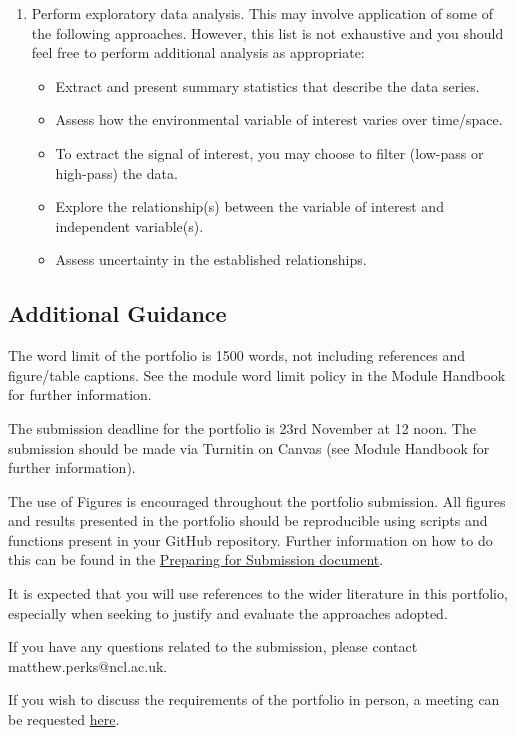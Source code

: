 \documentclass[11pt,onecolumn,a4paper,notitlepage]{article}
\begin{document}
\begin{enumerate}[resume]
\item{Perform exploratory data analysis. This may involve application of some of the following approaches. However, this list is not exhaustive and you should feel free to perform additional analysis as appropriate:} 

\begin{itemize}
\item{Extract and present summary statistics that describe the data series.}
\item{Assess how the environmental variable of interest varies over time/space.}
\item{To extract the signal of interest, you may choose to filter (low-pass or high-pass) the data.}
\item{Explore the relationship(s) between the variable of interest and independent variable(s).}
\item{Assess uncertainty in the established relationships.}
\end{itemize}

\end{enumerate}


\subsection*{Additional Guidance}

\noindent The word limit of the portfolio is 1500 words, not including references and figure/table captions. See the module word limit policy in the Module Handbook for further information.
\bigskip

\noindent 
The submission deadline for the portfolio is 23rd November at 12 noon. The submission should be made via Turnitin on Canvas (see Module Handbook for further information).
\bigskip

\noindent 
The use of Figures is encouraged throughout the portfolio submission. All figures and results presented in the portfolio should be reproducible using scripts and functions present in your GitHub repository. Further information on how to do this can be found in the \href{}{Preparing for Submission document}.
\bigskip

\noindent 
It is expected that you will use references to the wider literature in this portfolio, especially when seeking to justify and evaluate the approaches adopted.
\bigskip

\noindent If you have any questions related to the submission, please contact matthew.perks@ncl.ac.uk.

\bigskip

\noindent 
If you wish to discuss the requirements of the portfolio in person, a meeting can be requested \href{https://bit.ly/36YS3oW}{here}.
\end{document}
